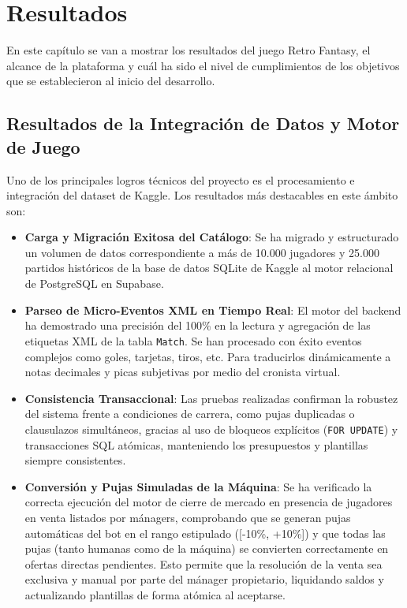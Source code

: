 \chapter{Resultados}
\label{chap:resultados}

En este capítulo se van a mostrar los resultados del juego Retro Fantasy, el alcance de la plataforma y cuál ha sido el nivel de cumplimientos de los objetivos que se establecieron al inicio del desarrollo.

\section{Resultados de la Integración de Datos y Motor de Juego}
\label{sec:resultados_datos}

Uno de los principales logros técnicos del proyecto es el procesamiento e integración del dataset de Kaggle. Los resultados más destacables en este ámbito son:

\begin{itemize}
    \item \textbf{Carga y Migración Exitosa del Catálogo}: Se ha migrado y estructurado un volumen de datos correspondiente a más de 10.000 jugadores y 25.000 partidos históricos de la base de datos SQLite de Kaggle al motor relacional de PostgreSQL en Supabase.
    \item \textbf{Parseo de Micro-Eventos XML en Tiempo Real}: El motor del backend ha demostrado una precisión del 100\% en la lectura y agregación de las etiquetas XML de la tabla \texttt{Match}. Se han procesado con éxito eventos complejos como goles, tarjetas, tiros, etc. Para traducirlos dinámicamente a notas decimales y picas subjetivas por medio del cronista virtual.
    \item \textbf{Consistencia Transaccional}: Las pruebas realizadas confirman la robustez del sistema frente a condiciones de carrera, como pujas duplicadas o clausulazos simultáneos, gracias al uso de bloqueos explícitos (\texttt{FOR UPDATE}) y transacciones SQL atómicas, manteniendo los presupuestos y plantillas siempre consistentes.
    \item \textbf{Conversión y Pujas Simuladas de la Máquina}: Se ha verificado la correcta ejecución del motor de cierre de mercado en presencia de jugadores en venta listados por mánagers, comprobando que se generan pujas automáticas del bot en el rango estipulado ([-10\%, +10\%]) y que todas las pujas (tanto humanas como de la máquina) se convierten correctamente en ofertas directas pendientes. Esto permite que la resolución de la venta sea exclusiva y manual por parte del mánager propietario, liquidando saldos y actualizando plantillas de forma atómica al aceptarse.
\end{itemize}

